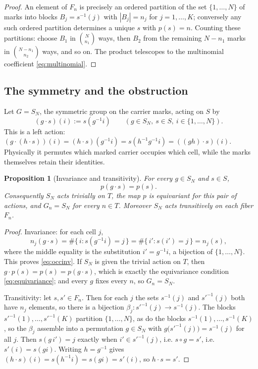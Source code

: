 \documentclass[11pt,reqno]{amsart}
\theoremstyle{plain}
\newtheorem{proposition}[theorem]{Proposition}
\theoremstyle{definition}
\theoremstyle{remark}
\begin{document}
\begin{proof}
An element of $F_{n}$ is precisely an ordered partition of the set $\{1,\ldots,N\}$ of marks into blocks $B_{j}=s^{-1}(j)$ with $|B_{j}|=n_{j}$ for $j=1,\ldots,K$; conversely any such ordered partition determines a unique $s$ with $p(s)=n$. Counting these partitions: choose $B_{1}$ in $\binom{N}{n_{1}}$ ways, then $B_{2}$ from the remaining $N-n_{1}$ marks in $\binom{N-n_{1}}{n_{2}}$ ways, and so on. The product telescopes to the multinomial coefficient \eqref{eq:multinomial}.
\end{proof}

\subsection{The symmetry and the obstruction}

Let $G=S_{N}$, the symmetric group on the carrier marks, acting on $S$ by
\begin{equation}
\label{eq:SNaction}
(g\cdot s)(i):=s(g^{-1}i)
\qquad (g\in S_{N},\ s\in S,\ i\in\{1,\ldots,N\}).
\end{equation}
This is a left action: $(g\cdot(h\cdot s))(i)=(h\cdot s)(g^{-1}i)=s(h^{-1}g^{-1}i)=((gh)\cdot s)(i)$. Physically it permutes which marked carrier occupies which cell, while the marks themselves retain their identities.

\begin{proposition}[Invariance and transitivity]
\label{prop:occinvariance}
For every $g\in S_{N}$ and $s\in S$,
\begin{equation}
\label{eq:occinv}
p(g\cdot s)=p(s).
\end{equation}
Consequently $S_{N}$ acts trivially on $T$, the map $p$ is equivariant for this pair of actions, and $G_{n}=S_{N}$ for every $n\in T$. Moreover $S_{N}$ acts transitively on each fiber $F_{n}$.
\end{proposition}

\begin{proof}
Invariance: for each cell $j$,
\[
n_{j}(g\cdot s)=\#\{\,i : s(g^{-1}i)=j\,\}
=\#\{\,i' : s(i')=j\,\}
=n_{j}(s),
\]
where the middle equality is the substitution $i'=g^{-1}i$, a bijection of $\{1,\ldots,N\}$. This proves \eqref{eq:occinv}. If $S_{N}$ is given the trivial action on $T$, then $g\cdot p(s)=p(s)=p(g\cdot s)$, which is exactly the equivariance condition \eqref{eq:equivariance}; and every $g$ fixes every $n$, so $G_{n}=S_{N}$.

Transitivity: let $s,s'\in F_{n}$. Then for each $j$ the sets $s^{-1}(j)$ and $s'^{-1}(j)$ both have $n_{j}$ elements, so there is a bijection $\beta_{j}\colon s'^{-1}(j)\to s^{-1}(j)$. The blocks $s'^{-1}(1),\ldots,s'^{-1}(K)$ partition $\{1,\ldots,N\}$, as do the blocks $s^{-1}(1),\ldots,s^{-1}(K)$, so the $\beta_{j}$ assemble into a permutation $g\in S_{N}$ with $g\bigl(s'^{-1}(j)\bigr)=s^{-1}(j)$ for all $j$. Then $s(g\,i')=j$ exactly when $i'\in s'^{-1}(j)$, i.e. $s\circ g=s'$, i.e. $s'(i)=s(g i)$. Writing $h=g^{-1}$ gives $(h\cdot s)(i)=s(h^{-1}i)=s(gi)=s'(i)$, so $h\cdot s=s'$.
\end{proof}
\end{document}
